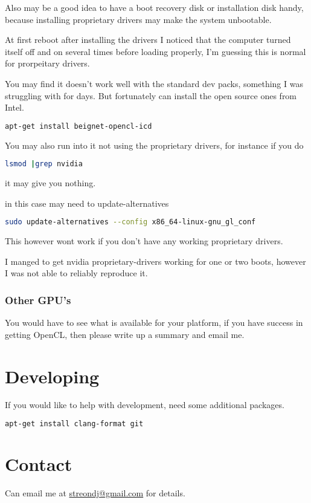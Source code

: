\documentclass[12pt]{article}
\begin{document}
Also may be a good idea to have a boot recovery disk or installation disk handy,
because installing proprietary drivers may make the system unbootable. 


At first reboot after installing the drivers I noticed that the computer turned
itself off and on several times before loading properly, I'm guessing this is
normal for prorpeitary drivers. 

You may find it doesn't work well with the standard dev packs, something I was
struggling with for days.  But fortunately can install the open source ones 
from Intel.

\begin{lstlisting}[language=bash]
apt-get install beignet-opencl-icd
\end{lstlisting}


You may also run into it not using the proprietary drivers, 
for instance if you do 
\begin{lstlisting}[language=bash]
lsmod |grep nvidia
\end{lstlisting}
it may give you nothing. 

in this case may need to update-alternatives
\begin{lstlisting}[language=bash]
sudo update-alternatives --config x86_64-linux-gnu_gl_conf
\end{lstlisting}

This however wont work if you don't have any working proprietary drivers. 

I manged to get nvidia proprietary-drivers working for one or two boots, however
I was not able to reliably reproduce it.

\subsubsection{Other GPU's}
You would have to see what is available for your platform,
if you have success in getting OpenCL, then please write up a summary and email
me.

\section{Developing}

If you would like to help with development, need some additional packages.
\begin{lstlisting}[language=bash]
apt-get install clang-format git
\end{lstlisting}

\section{Contact}
Can email me at \href{mailto:streondj@gmail.com}{streondj@gmail.com}
for details.
\printbibliography
\end{document}
